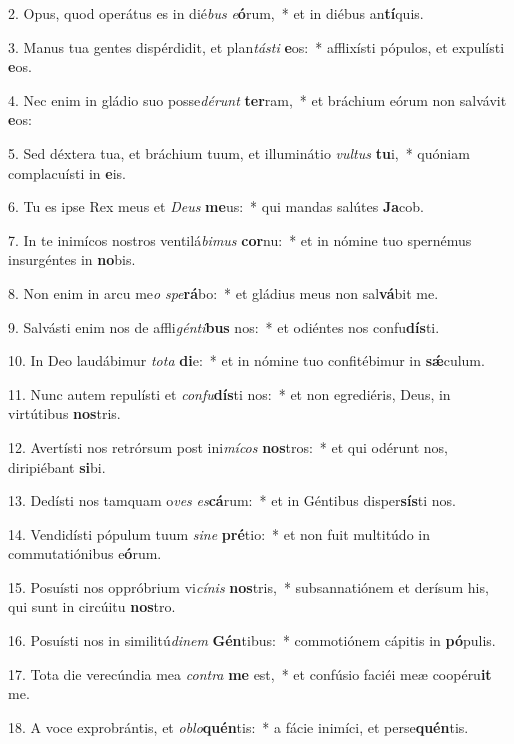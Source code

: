 2. Opus, quod operátus es in dié\textit{bus} \textit{e}\textbf{ó}rum,~*  et in diébus an\textbf{tí}quis.\

3. Manus tua gentes dispérdidit, et plan\textit{tás}\textit{ti} \textbf{e}os:~*  afflixísti pópulos, et expulísti \textbf{e}os.\

4. Nec enim in gládio suo posse\textit{dé}\textit{runt} \textbf{ter}ram,~*  et bráchium eórum non salvávit \textbf{e}os:\

5. Sed déxtera tua, et bráchium tuum, et illuminátio \textit{vul}\textit{tus} \textbf{tu}i,~*  quóniam complacuísti in \textbf{e}is.\

6. Tu es ipse Rex meus et \textit{De}\textit{us} \textbf{me}us:~*  qui mandas salútes \textbf{Ja}cob.\

7. In te inimícos nostros ventilá\textit{bi}\textit{mus} \textbf{cor}nu:~*  et in nómine tuo spernémus insurgéntes in \textbf{no}bis.\

8. Non enim in arcu me\textit{o} \textit{spe}\textbf{rá}bo:~*  et gládius meus non sal\textbf{vá}bit me.\

9. Salvásti enim nos de affli\textit{gén}\textit{ti}\textbf{bus} nos:~*  et odiéntes nos confu\textbf{dís}ti.\

10. In Deo laudábimur \textit{to}\textit{ta} \textbf{di}e:~*  et in nómine tuo confitébimur in \textbf{sǽ}culum.\

11. Nunc autem repulísti et \textit{con}\textit{fu}\textbf{dís}ti nos:~*  et non egrediéris, Deus, in virtútibus \textbf{nos}tris.\

12. Avertísti nos retrórsum post ini\textit{mí}\textit{cos} \textbf{nos}tros:~*  et qui odérunt nos, diripiébant \textbf{si}bi.\

13. Dedísti nos tamquam o\textit{ves} \textit{es}\textbf{cá}rum:~*  et in Géntibus disper\textbf{sís}ti nos.\

14. Vendidísti pópulum tuum \textit{si}\textit{ne} \textbf{pré}tio:~*  et non fuit multitúdo in commutatiónibus e\textbf{ó}rum.\

15. Posuísti nos oppróbrium vi\textit{cí}\textit{nis} \textbf{nos}tris,~*  subsannatiónem et derísum his, qui sunt in circúitu \textbf{nos}tro.\

16. Posuísti nos in similitú\textit{di}\textit{nem} \textbf{Gén}tibus:~*  commotiónem cápitis in \textbf{pó}pulis.\

17. Tota die verecúndia mea \textit{con}\textit{tra} \textbf{me} est,~*  et confúsio faciéi meæ coopéru\textbf{it} me.\

18. A voce exprobrántis, et \textit{ob}\textit{lo}\textbf{quén}tis:~*  a fácie inimíci, et perse\textbf{quén}tis.\

